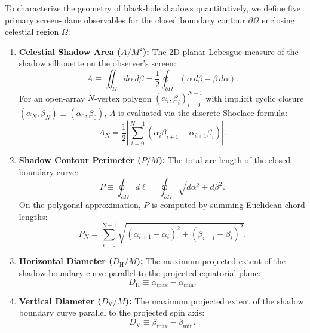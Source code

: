 To characterize the geometry of black-hole shadows quantitatively, we define five primary screen-plane observables for the closed boundary contour $\partial\Omega$ enclosing celestial region $\Omega$:
\begin{enumerate}[label=(\roman*)]
    \item \textbf{Celestial Shadow Area ($A/M^2$):}  
    The 2D planar Lebesgue measure of the shadow silhouette on the observer's screen:
    \begin{equation}
        A \equiv \iint_\Omega d\alpha\,d\beta = \frac{1}{2} \oint_{\partial\Omega} \left( \alpha\,d\beta - \beta\,d\alpha \right).
        \label{eq:area_def}
    \end{equation}
    For an open-array $N$-vertex polygon $(\alpha_i, \beta_i)_{i=0}^{N-1}$ with implicit cyclic closure $(\alpha_N, \beta_N) \equiv (\alpha_0, \beta_0)$, $A$ is evaluated via the discrete Shoelace formula:
    \begin{equation}
        A_N = \frac{1}{2} \left| \sum_{i=0}^{N-1} \left( \alpha_i \beta_{i+1} - \alpha_{i+1} \beta_i \right) \right|.
        \label{eq:shoelace_area}
    \end{equation}
    
    \item \textbf{Shadow Contour Perimeter ($P/M$):}  
    The total arc length of the closed boundary curve:
    \begin{equation}
        P \equiv \oint_{\partial\Omega} d\ell = \oint_{\partial\Omega} \sqrt{d\alpha^2 + d\beta^2}.
        \label{eq:perimeter_def}
    \end{equation}
    On the polygonal approximation, $P$ is computed by summing Euclidean chord lengths:
    \begin{equation}
        P_N = \sum_{i=0}^{N-1} \sqrt{ (\alpha_{i+1} - \alpha_i)^2 + (\beta_{i+1} - \beta_i)^2 }.
        \label{eq:polygonal_perimeter}
    \end{equation}

    \item \textbf{Horizontal Diameter ($D_{\mathrm{H}}/M$):}  
    The maximum projected extent of the shadow boundary curve parallel to the projected equatorial plane:
    \begin{equation}
        D_{\mathrm{H}} \equiv \alpha_{\max} - \alpha_{\min}.
        \label{eq:dh_def}
    \end{equation}

    \item \textbf{Vertical Diameter ($D_{\mathrm{V}}/M$):}  
    The maximum projected extent of the shadow boundary curve parallel to the projected spin axis:
    \begin{equation}
        D_{\mathrm{V}} \equiv \beta_{\max} - \beta_{\min}.
        \label{eq:dv_def}
    \end{equation}


\end{enumerate}
